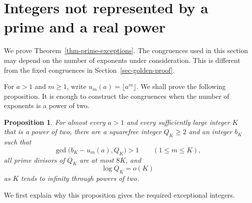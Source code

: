 \documentclass[11pt,reqno]{amsart}
\numberwithin{equation}{section}
\newtheorem{proposition}[theorem]{Proposition}
\begin{document}
    \section{Integers not represented by a prime and a real power}\label{sec-prime-exceptions}

We prove Theorem~\ref{thm-prime-exceptions}. The congruences used in this section may depend on the number of exponents under consideration. This is different from the fixed congruences in Section~\ref{sec-golden-proof}.

For $a>1$ and $m\ge1$, write $u_m(a)=\lfloor a^m\rfloor$. We shall prove the following proposition. It is enough to construct the congruences when the number of exponents is a power of two.

\begin{proposition}\label{prop-prime-cover}
For almost every $a>1$ and every sufficiently large integer $K$ that is a power of two, there are a squarefree integer $Q_K\ge2$ and an integer $b_K$ such that
\begin{equation}\label{eq-prime-cover}
 \gcd\bigl(b_K-u_m(a),Q_K\bigr)>1
 \qquad(1\le m\le K),
\end{equation}
all prime divisors of $Q_K$ are at most $8K$, and
\begin{equation}\label{eq-prime-cover-size}
 \log Q_K=o(K)
\end{equation}
as $K$ tends to infinity through powers of two.
\end{proposition}

We first explain why this proposition gives the required exceptional integers.
\end{document}

